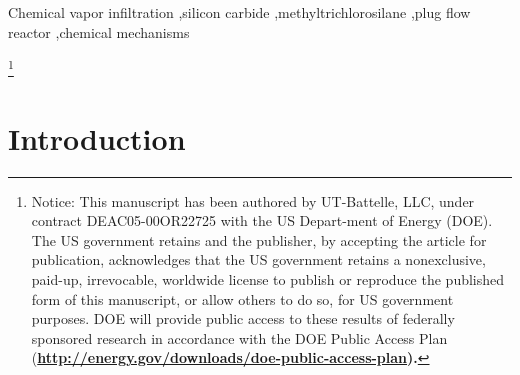 \documentclass[10pt, letterpaper]{elsarticle}
\begin{document}
\begin{frontmatter}
\begin{keyword}
Chemical vapor infiltration \sep silicon carbide \sep methyltrichlorosilane \sep plug flow reactor \sep chemical mechanisms


\end{keyword}

\end{frontmatter}

\let\thefootnote\relax\footnote{Notice: This manuscript has been authored by UT-Battelle, LLC, under contract DEAC05-00OR22725 with the US Depart-ment of Energy (DOE). The US government retains and the publisher, by accepting the article for publication, acknowledges that the US government retains a nonexclusive, paid-up, irrevocable, worldwide license to publish or reproduce the published form of this manuscript, or allow others to do so, for US government purposes. DOE will provide public access to these results of federally sponsored research in accordance with the DOE Public Access Plan (\bf \href{http://energy.gov/downloads/doe-public-access-plan}{http://energy.gov/downloads/doe-public-access-plan}).}

\section{Introduction}
\label{S:1}
\end{document}
